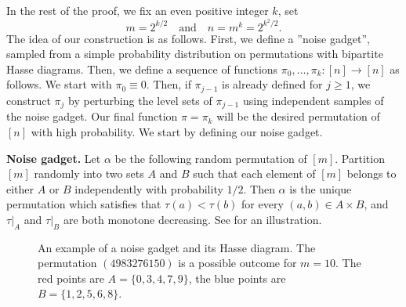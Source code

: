 \documentclass[11pt]{article}
\theoremstyle{definition}
\begin{document}
In the rest of the proof, we fix an even positive integer $k$, set $$m=2^{k/2}\quad\text{and}\quad n=m^k=2^{k^2/2}.$$ The idea of our construction is as follows. First, we define a ''noise gadget'', sampled from a simple probability distribution on permutations with bipartite Hasse diagrams. Then, we define a sequence of functions $\pi_0,\dots,\pi_k:[n]\rightarrow [n]$ as follows. We start with  $\pi_0\equiv 0$. Then, if $\pi_{j-1}$ is already defined for $j\geq 1$, we construct $\pi_{j}$ by perturbing the level sets of $\pi_{j-1}$ using independent samples of the noise gadget. Our final function $\pi=\pi_k$ will be the desired permutation of $[n]$ with high probability. We start by defining our noise gadget.

\medskip

\noindent
\textbf{Noise gadget.} Let $\alpha$ be the following random permutation of $[m]$. Partition $[m]$ randomly into two sets $A$ and $B$ such that each element of $[m]$ belongs to either $A$ or $B$ independently with probability $1/2$. Then $\alpha$ is the unique permutation which satisfies that $\tau(a)<\tau(b)$ for every $(a,b)\in A\times B$, and $\tau|_A$ and $\tau|_B$ are both monotone decreasing. See  for an illustration.
\begin{figure}[ht]
\begin{center}
\end{center}
\caption{An example of a noise gadget and its Hasse diagram. The permutation $(4983276150)$ is a possible outcome for $m=10$.  The red points are $A=\{0,3,4,7,9\}$, the blue points are $B=\{1,2,5,6,8\}$.}
\label{fig:1}
\end{figure}
\end{document}
